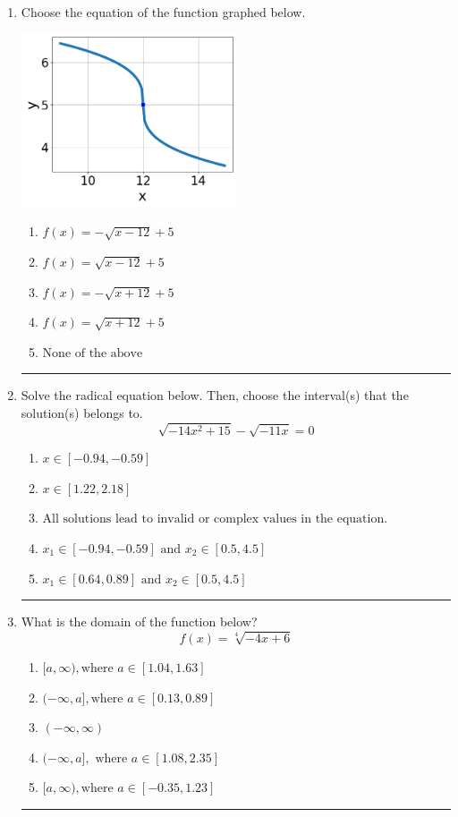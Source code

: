 \documentclass[14pt]{extbook}
\newcommand{\litem}[1]{\item#1\hspace*{-1cm}\rule{\textwidth}{0.4pt}}
\begin{document}
\begin{enumerate}
{\begin{enumerate}[label=\Alph*.]
\end{enumerate} }
\litem{
Choose the equation of the function graphed below.
\begin{center}
    \includegraphics[width=0.5\textwidth]{../Figures/radicalGraphToEquationB.png}
\end{center}
\begin{enumerate}[label=\Alph*.]
\item \( f(x) = - \sqrt{x - 12} + 5 \)
\item \( f(x) = \sqrt{x - 12} + 5 \)
\item \( f(x) = - \sqrt{x + 12} + 5 \)
\item \( f(x) = \sqrt{x + 12} + 5 \)
\item \( \text{None of the above} \)

\end{enumerate} }
\litem{
Solve the radical equation below. Then, choose the interval(s) that the solution(s) belongs to.\[ \sqrt{-14 x^2 + 15} - \sqrt{-11 x} = 0 \]\begin{enumerate}[label=\Alph*.]
\item \( x \in [-0.94,-0.59] \)
\item \( x \in [1.22,2.18] \)
\item \( \text{All solutions lead to invalid or complex values in the equation.} \)
\item \( x_1 \in [-0.94, -0.59] \text{ and } x_2 \in [0.5,4.5] \)
\item \( x_1 \in [0.64, 0.89] \text{ and } x_2 \in [0.5,4.5] \)

\end{enumerate} }
\litem{
What is the domain of the function below?\[ f(x) = \sqrt[4]{-4 x + 6} \]\begin{enumerate}[label=\Alph*.]
\item \( [a, \infty), \text{where } a \in [1.04, 1.63] \)
\item \( (-\infty, a], \text{where } a \in [0.13, 0.89] \)
\item \( (-\infty, \infty) \)
\item \( (-\infty, a], \text{ where } a \in [1.08, 2.35] \)
\item \( [a, \infty), \text{where } a \in [-0.35, 1.23] \)


\end{enumerate}}
\end{enumerate}
\end{document}
